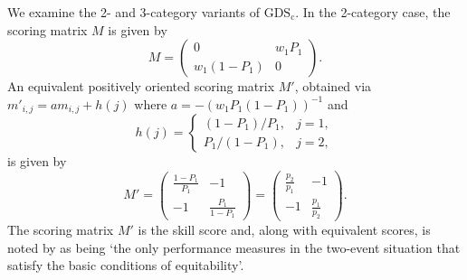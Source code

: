 \documentclass[10pt]{article} %
\theoremstyle{theorem}
\theoremstyle{definition}
\newcommand{\ds}{\displaystyle}
\newcommand{\GDSc}{\mathrm{GDS}_\mathrm{c}}
\begin{document}
We examine the 2- and 3-category variants of $\GDSc$. In the 2-category case, the scoring matrix $M$ is given by
\[M
=\begin{pmatrix}
0 & w_1 P_1 \\
w_1(1-P_1) & 0 
\end{pmatrix}.
\]
An equivalent positively oriented scoring matrix $M'$, obtained via $m'_{i,j}=a m_{i,j}+h(j)$ where $a=-(w_1 P_1(1-P_1))^{-1}$ and
\[
h(j)=
\begin{cases}
(1-P_1)/P_1, & j=1, \\
P_1/(1-P_1), & j=2,
\end{cases}
\]
is given by
\[
M'
=\left(\begin{matrix}
\ds\frac{1-P_1}{P_1} & -1 \\
-1 & \ds\frac{P_1}{1-P_1}
\end{matrix}\right)
=\left(\begin{matrix}
\ds\frac{p_2}{p_1} & -1 \\
-1 & \ds\frac{p_1}{p_2}
\end{matrix}\right).
\]
The scoring matrix $M'$ is the \citet{peirce1884numerical} skill score \citep[Table~2]{rodwell2010new} and, along with equivalent scores, is noted by \citet{gandin1992equitable} as being `the only performance measures in the two-event situation that satisfy the basic conditions of equitability'.

\end{document}
